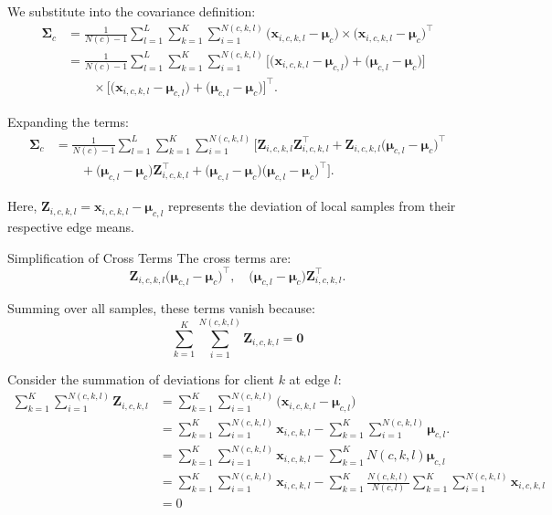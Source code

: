 \documentclass[journal]{IEEEtran}
\begin{document}
We substitute into the covariance definition:
\begin{align*}
\mathbf{\Sigma}_c 
&= \frac{1}{N(c)-1} \sum_{l=1}^L \sum_{k=1}^K \sum_{i=1}^{N(c,k,l)} 
\big( \mathbf{x}_{i,c,k,l} - \mathbf{\mu}_c \big) \nonumber \times 
\big( \mathbf{x}_{i,c,k,l} - \mathbf{\mu}_c \big)^\top \\ 
&= \frac{1}{N(c)-1} \sum_{l=1}^L \sum_{k=1}^K \sum_{i=1}^{N(c,k,l)} 
\Big[
\big( \mathbf{x}_{i,c,k,l} - \mathbf{\mu}_{c,l} \big) + \big( \mathbf{\mu}_{c,l} - \mathbf{\mu}_c \big)
\Big] \nonumber \\
&\qquad \times 
\Big[
\big( \mathbf{x}_{i,c,k,l} - \mathbf{\mu}_{c,l} \big) + \big( \mathbf{\mu}_{c,l} - \mathbf{\mu}_c \big)
\Big]^\top.
\end{align*}

Expanding the terms:
\begin{align}
\mathbf{\Sigma}_c &= \frac{1}{N(c)-1} \sum_{l=1}^L \sum_{k=1}^K \sum_{i=1}^{N(c,k,l)} 
\Big[
\mathbf{Z}_{i,c,k,l} \mathbf{Z}_{i,c,k,l}^\top + 
\mathbf{Z}_{i,c,k,l} \big( \mathbf{\mu}_{c,l} - \mathbf{\mu}_c \big)^\top \nonumber \\
&\qquad + 
\big( \mathbf{\mu}_{c,l} - \mathbf{\mu}_c \big) \mathbf{Z}_{i,c,k,l}^\top + 
\big( \mathbf{\mu}_{c,l} - \mathbf{\mu}_c \big) \big( \mathbf{\mu}_{c,l} - \mathbf{\mu}_c \big)^\top
\Big].
\end{align}

Here, \( \mathbf{Z}_{i,c,k,l} = \mathbf{x}_{i,c,k,l} - \mathbf{\mu}_{c,l} \) represents the deviation of local samples from their respective edge means.

Simplification of Cross Terms
The cross terms are:
\begin{equation}
\mathbf{Z}_{i,c,k,l} \big( \mathbf{\mu}_{c,l} - \mathbf{\mu}_c \big)^\top, \quad
\big( \mathbf{\mu}_{c,l} - \mathbf{\mu}_c \big) \mathbf{Z}_{i,c,k,l}^\top.
\end{equation}

Summing over all samples, these terms vanish because:
\begin{equation}
  \sum_{k=1}^K \sum_{i=1}^{N(c,k,l)} \mathbf{Z}_{i,c,k,l} = \mathbf{0}
\end{equation}

Consider the summation of deviations for client \( k \) at edge \( l \):
\begin{align*}
\sum_{k=1}^K\sum_{i=1}^{N(c,k,l)} \mathbf{Z}_{i,c,k,l} &= \sum_{k=1}^K \sum_{i=1}^{N(c,k,l)} \big( \mathbf{x}_{i,c,k,l} - \mathbf{\mu}_{c,l} \big) \\
&= \sum_{k=1}^K\sum_{i=1}^{N(c,k,l)} \mathbf{x}_{i,c,k,l} - \sum_{k=1}^K\sum_{i=1}^{N(c,k,l)} \mathbf{\mu}_{c,l}. \\
&= \sum_{k=1}^K\sum_{i=1}^{N(c,k,l)} \mathbf{x}_{i,c,k,l} - \sum_{k=1}^K N(c,k,l) \mathbf{\mu}_{c,l} \\
&= \sum_{k=1}^K\sum_{i=1}^{N(c,k,l)} \mathbf{x}_{i,c,k,l} - \sum_{k=1}^K\frac{N(c,k,l)}{N(c,l)} \sum_{k=1}^K \sum_{i=1}^{N(c,k,l)} \mathbf{x}_{i,c,k,l} \\
&= 0
\end{align*}
\end{document}
